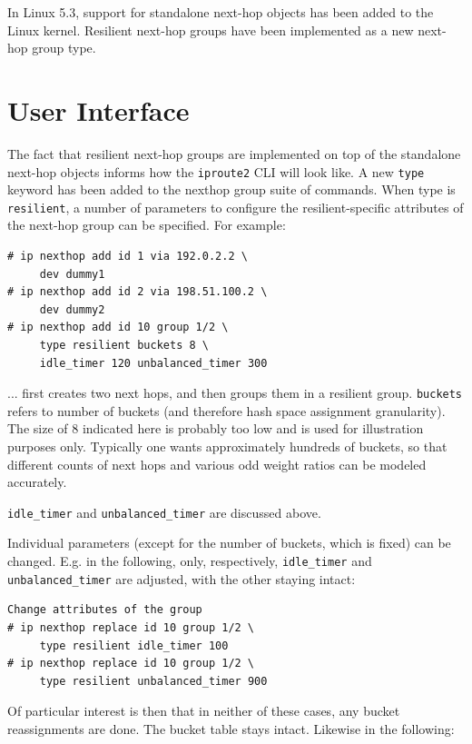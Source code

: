 \documentclass[letterpaper]{article}
\begin{document}
In Linux 5.3, support for standalone next-hop objects has been added to the
Linux kernel. Resilient next-hop groups have been implemented as a new
next-hop group type.

\section{User Interface}

The fact that resilient next-hop groups are implemented on top of the
standalone next-hop objects informs how the \texttt{iproute2} CLI will look
like. A new \texttt{type} keyword has been added to the nexthop group suite
of commands. When type is \texttt{resilient}, a number of parameters to
configure the resilient-specific attributes of the next-hop group can be
specified. For example:

\begin{verbatim}
# ip nexthop add id 1 via 192.0.2.2 \
     dev dummy1
# ip nexthop add id 2 via 198.51.100.2 \
     dev dummy2
# ip nexthop add id 10 group 1/2 \
     type resilient buckets 8 \
     idle_timer 120 unbalanced_timer 300
\end{verbatim}

... first creates two next hops, and then groups them in a resilient group.
\texttt{buckets} refers to number of buckets (and therefore hash space
assignment granularity). The size of 8 indicated here is probably too low
and is used for illustration purposes only. Typically one wants
approximately hundreds of buckets, so that different counts of next hops
and various odd weight ratios can be modeled accurately.

\texttt{idle\_timer} and \texttt{unbalanced\_timer} are discussed above.

Individual parameters (except for the number of buckets, which is fixed)
can be changed. E.g. in the following, only, respectively,
\texttt{idle\_timer} and \texttt{unbalanced\_timer} are adjusted, with the
other staying intact:

\begin{verbatim}
Change attributes of the group
# ip nexthop replace id 10 group 1/2 \
     type resilient idle_timer 100
# ip nexthop replace id 10 group 1/2 \
     type resilient unbalanced_timer 900
\end{verbatim}

Of particular interest is then that in neither of these cases, any bucket
reassignments are done. The bucket table stays intact. Likewise in the
following:
\end{document}

